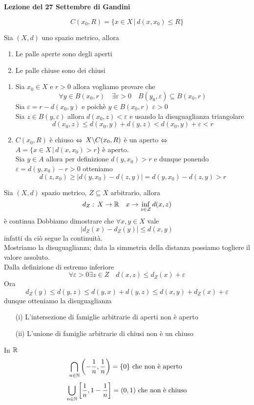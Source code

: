 


\textbf{Lezione del 27 Settembre di Gandini}
\begin{defn}\bianco
$$C(x_0, R)=\{ x \in X \, \vert \, d(x,x_0) \leq R \}$$
\end{defn}
\begin{prop} Sia $(X,d)$ uno spazio metrico, allora
\begin{enumerate}
\item Le palle aperte sono degli aperti
\item Le palle chiuse sono dei chiusi
\end{enumerate}
\proof \bbianco
\begin{enumerate}
\item  Sia $x_0 \in X $ e $r>0$ allora vogliamo provare che 
$$ \forall y\in B(x_0,r) \quad \exists \varepsilon>0 \quad B(y_0, \varepsilon) \subseteq B(x_0,r)$$
Sia $\varepsilon= r-d(x_0,y)$ e poich\`e $y\in B(x_0,r) $ $\varepsilon>0$\\
Sia $z\in B(y,\varepsilon) $ allora $d(x_0,z)< \varepsilon $ e usando la disuguaglianza triangolare
$$ d(x_0,z)\leq d(x_0,y)+ d(y,z) < d(x_0,y) + \varepsilon <r $$
\item $C(x_0,R)$ \`e chiuso $\Leftrightarrow$ $X\backslash C(x_0,R)$ \`e un aperto $\Leftrightarrow $ $A=\{ x\in X \, \vert \, d(x,x_0)>r\} $ \`e aperto.\\
Sia $y\in A$ allora per definizione $d(y,x_0)>r $ e dunque ponendo $\varepsilon=d(y,x_0)-r>0$ otteniamo 
$$ d(z,x_0) \geq \vert d(y,x_0) - d(z,y) \vert = d(y,x_0)-d(z,y)>r$$
\end{enumerate}
\endproof
\end{prop}
\spazio
\begin{ese}Sia $(X,d)$ spazio metrico, $Z\subseteq X $ arbitrario, allora 
$$ d_Z:\, X \to \mathbb{R} \quad x \to \inf_{z\in Z} d(x,z)$$
\`e continua
\proof Dobbiamo dimostrare che $\forall x,y\in X$ vale 
$$ \vert d_Z(x) -d_Z(y) \vert \leq d(x,y)$$
infatti da ci\`o segue la continuit\`a.\\
Mostriamo la disuguaglianza; data la simmetria della distanza possiamo togliere il valore assoluto.\\
Dalla definizione di estremo inferiore
$$ \forall \varepsilon>0 \exists z \in Z \quad d(x,z) \leq d_Z(x) + \varepsilon$$
Ora $$d_Z(y)\leq d(y,z)\leq d(y,x)+d(y,z)\leq d(x,y) +d_Z(x)+\varepsilon$$
dunque otteniamo la disuguaglianza
\end{ese}
\newpage
\begin{ese}\bianco 
\begin{itemize}
\item[(i)]L'intersezione di famiglie arbitrarie di aperti non \`e aperto 
\item[(ii)]L'unione di famiglie arbitrarie di chiusi non \`e un chiuso 
\end{itemize}
In $\mathbb{R}$ 
$$ \bigcap_{n \in \mathbb{N}} \left( -\frac{1}{n}, \frac{1}{n}\right) =\{ 0\} \text{ che non \`e aperto } $$
$$ \bigcup_{n\in \mathbb{N}}  \left[ \frac{1}{n}, 1-\frac{1}{n}\right]=(0,1)\text{ che non \`e chiuso} $$
\end{ese}
